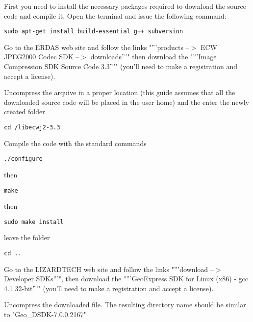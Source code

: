 First you need to install the necessary packages required to download the source 
code and compile it. Open the terminal and issue the following command:

\begin{verbatim}
sudo apt-get install build-essential g++ subversion
\end{verbatim}

Go to the ERDAS web site  and follow the links
"'''products --$>$ ECW JPEG2000 Codec SDK --$>$ downloads'''" 
then download the "'''Image Compression SDK Source Code 3.3'''" (you'll need to make a registration 
and accept a license).

Uncompress the arquive in a proper location (this guide assumes 
that all the downloaded source code will be placed in the user home) 
and the enter the newly created folder

\begin{verbatim}
cd /libecwj2-3.3
\end{verbatim}

Compile the code with the standard commands

\begin{verbatim}
./configure
\end{verbatim}

then

\begin{verbatim}
make
\end{verbatim}

then

\begin{verbatim}
sudo make install
\end{verbatim}

leave the folder 

\begin{verbatim}
cd ..
\end{verbatim}

Go to the LIZARDTECH web site  and follow the links
"'''download --$>$ Developer SDKs'''", 
then download the "'''GeoExpress SDK for Linux (x86) - gcc 4.1 32-bit'''"
(you'll need to make a registration and accept a license).

Uncompress the downloaded file. The resulting directory name should be similar to "Geo\_DSDK-7.0.0.2167"

